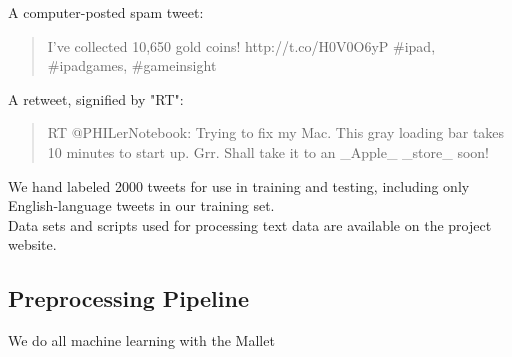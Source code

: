 \documentclass[letterpaper]{article}
\begin{document}
A computer-posted spam tweet:
\begin{quote}
I've collected 10,650 gold coins! http://t.co/H0V0O6yP \#ipad, \#ipadgames, \#gameinsight\\
\end{quote}

A retweet, signified by "RT":
\begin{quote}
RT @PHILerNotebook: Trying to fix my Mac. This gray loading bar takes 10 minutes to start up. Grr. Shall take it to an \_Apple\_ \_store\_ soon! \\
\end{quote}

We hand labeled 2000 tweets for use in training and testing, including only English-language tweets in our training set. \\
Data sets and scripts used for processing text data are available on the project website.\\

\subsection{Preprocessing Pipeline}

We do all machine learning with the Mallet%
\end{document}
